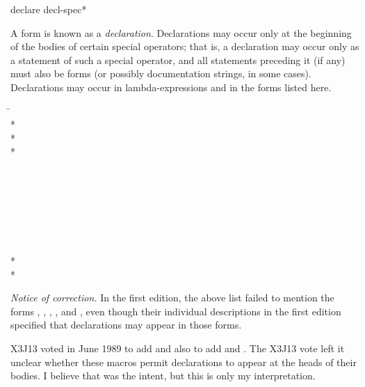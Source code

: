 \begin{defspec}
declare {decl-spec}*

A  form is known as a \emph{declaration}.
Declarations may occur only at the beginning of the bodies of
certain special operators;
that is, a declaration may occur only as a statement
of such a special operator, and all statements preceding it (if any) must
also be  forms (or possibly documentation strings, in some cases).
Declarations may occur in lambda-expressions and in the forms listed here.
\begin{lisp}
\hskip 12pc\=\kill
{}\> \\*
\> \\*
\> \\*
\> \\
\> \\
\> \\
\> \\
\> \\
\> \\
\> \\
\> \\*
\> \\*
\end{lisp}
\begin{new}%
\emph{Notice of correction.}
In the first edition, the above list failed to mention the forms
, , ,
, and , even though
their individual descriptions in the first edition specified that declarations
may appear in those forms.
\end{new}

X3J13 voted in June 1989  to add 
and also  to add 
and .
The X3J13 vote left it unclear whether these macros
permit declarations to appear at the heads of their bodies.
I believe that was the intent,
but this is only my interpretation.


\end{defspec}
